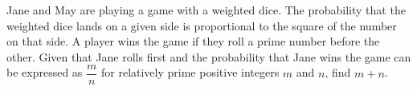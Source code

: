 Jane and May are playing a game with a weighted dice. The probability that the weighted dice lands on a given side is proportional to the square of the number on that side. A player wins the game if they roll a prime number before the other. Given that Jane rolls first and the probability that Jane wins the game can be expressed as $\dfrac{m}{n}$ for relatively prime positive integers $m$ and $n$, find $m + n$.
